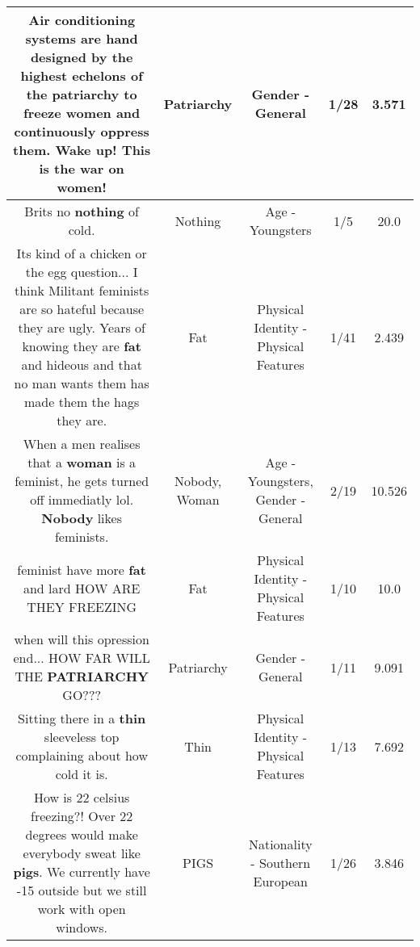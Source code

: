 \documentclass[11pt]{article}
\newlength\mylength
\begin{document}
\begin{center}
\begin{longtable}{|C{.65\mylength}|C{.30\mylength}|C{.12\mylength}|C{.12\mylength}|C{.12\mylength}|}
  \small Air conditioning systems are hand designed by the highest echelons of the \textbf{patriarchy} to freeze women and continuously oppress them. Wake up! This is the war on women!\normalsize   & Patriarchy & Gender - General & 1/28 & 3.571 \\  \hline
  \small Brits no \textbf{nothing} of cold.\normalsize   & Nothing & Age - Youngsters & 1/5 & 20.0 \\  \hline
  \small Its kind of a chicken or the egg question... I think Militant feminists are so hateful because they are ugly. Years of knowing they are \textbf{fat} and hideous and that no man wants them has made them the hags they are.\normalsize   & Fat & Physical Identity - Physical Features & 1/41 & 2.439 \\  \hline
  \small When a men realises that a \textbf{woman} is a feminist, he gets turned off immediatly lol. \textbf{Nobody} likes feminists.\normalsize   & Nobody, Woman & Age - Youngsters, Gender - General & 2/19 & 10.526 \\  \hline
  \small feminist have more \textbf{fat} and lard HOW ARE THEY FREEZING\normalsize   & Fat & Physical Identity - Physical Features & 1/10 & 10.0 \\  \hline
  \small when will this opression end... HOW FAR WILL THE \textbf{PATRIARCHY} GO???\normalsize   & Patriarchy & Gender - General & 1/11 & 9.091 \\  \hline
  \small Sitting there in a \textbf{thin} sleeveless top complaining about how cold it is.\normalsize   & Thin & Physical Identity - Physical Features & 1/13 & 7.692 \\  \hline
  \small How is 22 celsius freezing?! Over 22 degrees would make everybody sweat like \textbf{pigs}. We currently have -15 outside but we still work with open windows.\normalsize   & PIGS & Nationality - Southern European & 1/26 & 3.846 \\  \hline

\end{longtable}
\end{center}
\end{document}
